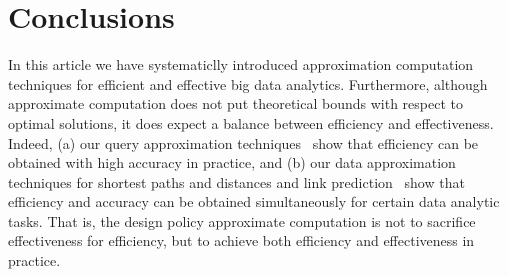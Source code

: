 \section{Conclusions}
\label{sec-conclusion}

In this article we have systematiclly introduced approximation computation techniques for efficient and effective big data analytics.
Furthermore, although approximate computation does not put
theoretical bounds with respect to optimal solutions, it does expect a balance between efficiency and effectiveness. Indeed, (a) our query approximation techniques~\cite{tods-MaCFHW14,LinMZWH17,MaHWLH17} show that efficiency can be obtained with high accuracy in practice, and (b) our data approximation techniques for shortest paths and distances and link prediction~\cite{MaFLWCH16,DuanMAMH17} show that efficiency and accuracy can be obtained simultaneously for certain data analytic tasks. That is, the design policy approximate computation is not to sacrifice effectiveness for efficiency, but to achieve both efficiency and effectiveness in practice.


